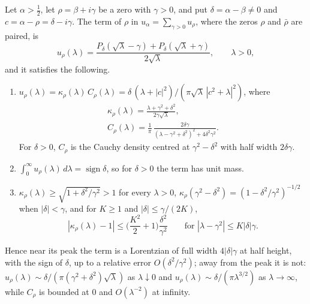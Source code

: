\begin{proposition}\label{mw:prop:lambda}
Let $\alpha>\frac12$, let $\rho=\beta+i\gamma$ be a zero with $\gamma>0$, and put $\delta=\alpha-\beta\ne0$ and $c=\alpha-\rho=\delta-i\gamma$. The term of $\rho$ in $u_\alpha=\sum_{\gamma>0}u_\rho$, where the zeros $\rho$ and $\bar\rho$ are paired, is
\begin{equation}\label{mw:eq:zeroterm}
u_\rho(\lambda)=\frac{P_\delta(\sqrt\lambda-\gamma)+P_\delta(\sqrt\lambda+\gamma)}{2\sqrt\lambda},\qquad\lambda>0,
\end{equation}
and it satisfies the following.
\begin{enumerate}
\item[(a)] $u_\rho(\lambda)=\kappa_\rho(\lambda)\,C_\rho(\lambda)=\delta\,(\lambda+|c|^2)/(\pi\sqrt\lambda\,|c^2+\lambda|^2)$, where
\begin{gather*}
\kappa_\rho(\lambda)=\frac{\lambda+\gamma^2+\delta^2}{2\gamma\sqrt\lambda},\\
C_\rho(\lambda)=\frac1\pi\,\frac{2\delta\gamma}{(\lambda-\gamma^2+\delta^2)^2+4\delta^2\gamma^2}.
\end{gather*}
For $\delta>0$, $C_\rho$ is the Cauchy density centred at $\gamma^2-\delta^2$ with half width $2\delta\gamma$.
\item[(b)] $\int_0^\infty u_\rho(\lambda)\,d\lambda=\operatorname{sign}\delta$, so for $\delta>0$ the term has unit mass.
\item[(c)] $\kappa_\rho(\lambda)\ge\sqrt{1+\delta^2/\gamma^2}>1$ for every $\lambda>0$, $\kappa_\rho(\gamma^2-\delta^2)=(1-\delta^2/\gamma^2)^{-1/2}$ when $|\delta|<\gamma$, and for $K\ge1$ and $|\delta|\le\gamma/(2K)$,
\[
|\kappa_\rho(\lambda)-1|\le\Big(\frac{K^2}2+1\Big)\frac{\delta^2}{\gamma^2}\qquad\text{for }|\lambda-\gamma^2|\le K|\delta|\gamma .
\]
\end{enumerate}
Hence near its peak the term is a Lorentzian of full width $4|\delta|\gamma$ at half height, with the sign of $\delta$, up to a relative error $O(\delta^2/\gamma^2)$; away from the peak it is not: $u_\rho(\lambda)\sim\delta/(\pi(\gamma^2+\delta^2)\sqrt\lambda)$ as $\lambda\downarrow0$ and $u_\rho(\lambda)\sim\delta/(\pi\lambda^{3/2})$ as $\lambda\to\infty$, while $C_\rho$ is bounded at $0$ and $O(\lambda^{-2})$ at infinity.
\end{proposition}

